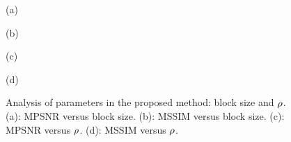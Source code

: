 \begin{figure}[t]
\begin{center}
        \begin{minipage}{0.240\hsize}
            \centerline{\small{(a)}}
		\end{minipage}
		\begin{minipage}{0.240\hsize}
			\centerline{\small{(b)}}
		\end{minipage}
		\begin{minipage}{0.240\hsize}
			\centerline{\small{(c)}}
		\end{minipage}
		\begin{minipage}{0.240\hsize}
			\centerline{\small{(d)}}
		\end{minipage}
    \end{center}
	
    \vspace{-3mm}
    \caption{Analysis of parameters in the proposed method: block size and $\rho$. (a): MPSNR versus block size. (b): MSSIM versus block size. (c): MPSNR versus $\rho$. (d): MSSIM versus $\rho$. }
    \label{fig:Param_Anal}
\end{figure}